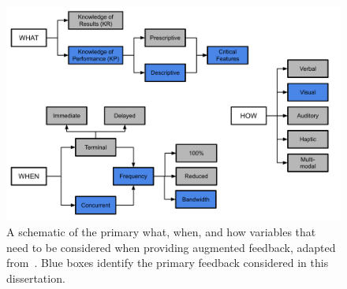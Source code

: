 \begin{figure}[tb]
    \begin{center}
        \includegraphics[width=\linewidth]{figures/Introduction/feedbackschematichighlighted.pdf}
        \caption[A schematic of the primary what, when, and how variables that need to be considered when providing augmented feedback]{A schematic of the primary what, when, and how variables that need to be considered when providing augmented feedback, adapted from~\citep{hodges2020skill}. Blue boxes identify the primary feedback considered in this dissertation.}
        \label{figure:afvariables}
    \end{center}
\end{figure}


